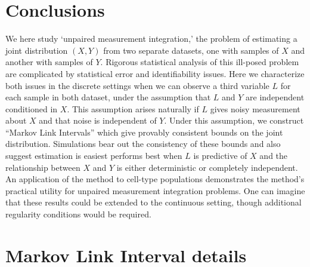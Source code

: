 \documentclass{article}
\theoremstyle{definition}
\begin{document}
                                                    

\section{Conclusions}

We here study `unpaired measurement integration,' the problem of estimating a joint distribution $(X,Y)$ from two separate datasets, one with samples of $X$ and another with samples of $Y$.  Rigorous statistical analysis of this ill-posed problem are complicated by statistical error and identifiability issues.  Here we characterize both issues in the discrete settings when we can observe a third variable $L$ for each sample in both dataset, under the assumption that $L$ and $Y$ are independent conditioned in $X$.  This assumption arises naturally if $L$ gives noisy measurement about $X$ and that noise is independent of $Y$.  Under this assumption, we construct ``Markov Link Intervals'' which give provably consistent bounds on the joint distribution.  Simulations bear out the consistency of these bounds and also suggest estimation is easiest performs best when $L$ is predictive of $X$ and the relationship between $X$ and $Y$ is either deterministic or completely independent.  An application of the method to cell-type populations demonstrates the method's practical utility for unpaired measurement integration problems.  One can imagine that these results could be extended to the continuous setting, though additional regularity conditions would be required.  




                                                 


\appendix

\section{Markov Link Interval details}
\label{sec:mlmdetails}
\end{document}
